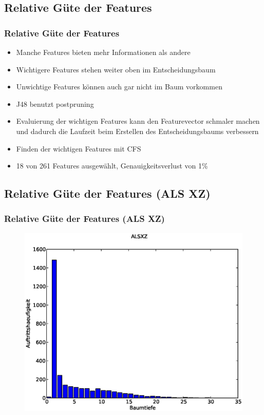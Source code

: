 \documentclass[accentcolor=tud6b,colorbacktitle,inverttitle,landscape,german,presentation,t]{tudbeamer}
\begin{document}
	\subsection{Relative Güte der Features}
		\begin{frame}
		\frametitle{Relative Güte der Features}
		\begin{itemize}
		\item Manche Features bieten mehr Informationen als andere
		\item Wichtigere Features stehen weiter oben im Entscheidungsbaum
		\item Unwichtige Features können auch gar nicht im Baum vorkommen
		\item J48 benutzt postpruning
		\item Evaluierung der wichtigen Features kann den Featurevector schmaler machen und dadurch die Laufzeit beim Erstellen des Entscheidungsbaums verbessern
		\item Finden der wichtigen Features mit CFS
		\item18 von 261 Features ausgewählt, Genauigkeitsverlust von 1\%
		\end{itemize}
		\end{frame}

	\subsection{Relative Güte der Features (ALS XZ)}
		\begin{frame}
		\frametitle{Relative Güte der Features (ALS XZ)}
		\begin{figure}[Hh]
		\includegraphics[width=\textwidth,height=\textheight,keepaspectratio]{./img/ALSXZ_hist.eps}
		\end{figure}
		\end{frame}
\end{document}
